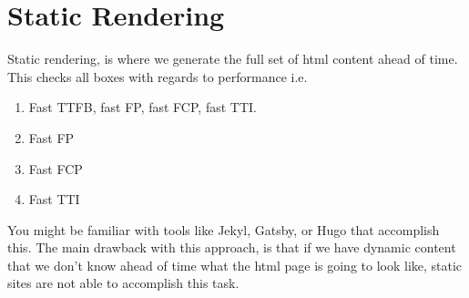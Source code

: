 \section{Static Rendering}
Static rendering, is where we generate the full set of html content ahead of time. This checks all boxes with regards to performance i.e. 
\begin{enumerate}
  \item Fast TTFB, fast FP, fast FCP, fast TTI. 
  \item Fast FP
  \item Fast FCP
  \item Fast TTI  
\end{enumerate}

You might be familiar with tools like Jekyl, Gatsby, or Hugo that accomplish this. The main drawback with this approach, is that if we have dynamic content that we don't know ahead of time what the html page is going to look like, static sites are not able to accomplish this task. 

